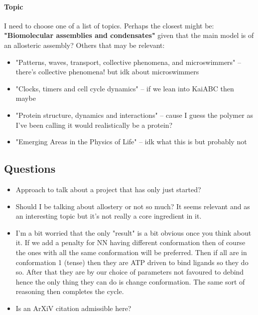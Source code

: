 \documentclass[11pt]{article}
\begin{document}
\paragraph{Topic}
I need to choose one of a list of topics.
Perhaps the closest might be: \textbf{"Biomolecular assemblies and condensates"} given that the main model is of an allosteric assembly?
Others that may be relevant:
\begin{itemize}
	\item "Patterns, waves, transport, collective phenomena, and microswimmers" -- there's collective phenomena! but idk about microswimmers
	\item "Clocks, timers and cell cycle dynamics" -- if we lean into KaiABC then maybe
	\item "Protein structure, dynamics and interactions" -- cause I guess the polymer as I've been calling it would realistically be a protein?
	\item "Emerging Areas in the Physics of Life" -- idk what this is but probably not
\end{itemize}

\subsection{Questions}
\begin{itemize}
	\item Approach to talk about a project that has only just started?
	\item Should I be talking about allostery or not so much? It seems relevant and as an interesting topic but it's not really a core ingredient in it.
	\item I'm a bit worried that the only "result" is a bit obvious once you think about it. If we add a penalty for NN having different conformation then of course the ones with all the same conformation will be preferred. Then if all are in conformation 1 (tense) then they are ATP driven to bind ligands so they do so. After that they are by our choice of parameters not favoured to debind hence the only thing they can do is change conformation. The same sort of reasoning then completes the cycle.
	\item Is an ArXiV citation admissible here?\cite{soneHermitianNonHermitianTopology2024}
\end{itemize}
\end{document}
